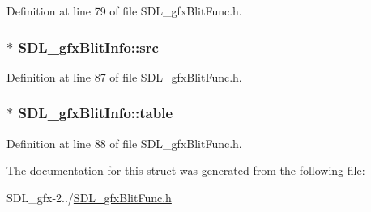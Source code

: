 Definition at line 79 of file S\+D\+L\+\_\+gfx\+Blit\+Func.\+h.

\hypertarget{struct_s_d_l__gfx_blit_info_a0af69b3969646f3b36d917ca8a6b63a0}{}
\subsubsection[{src}]{$\ast$ S\+D\+L\+\_\+gfx\+Blit\+Info\+::src}\label{struct_s_d_l__gfx_blit_info_a0af69b3969646f3b36d917ca8a6b63a0}


Definition at line 87 of file S\+D\+L\+\_\+gfx\+Blit\+Func.\+h.

\hypertarget{struct_s_d_l__gfx_blit_info_a0aef408dbc6b41b08be7044539d2ffcc}{}
\subsubsection[{table}]{$\ast$ S\+D\+L\+\_\+gfx\+Blit\+Info\+::table}\label{struct_s_d_l__gfx_blit_info_a0aef408dbc6b41b08be7044539d2ffcc}


Definition at line 88 of file S\+D\+L\+\_\+gfx\+Blit\+Func.\+h.



The documentation for this struct was generated from the following file\+:\begin{DoxyCompactItemize}
\item 
S\+D\+L\+\_\+gfx-\/2../\hyperlink{_s_d_l__gfx_blit_func_8h}{S\+D\+L\+\_\+gfx\+Blit\+Func.\+h}\end{DoxyCompactItemize}
